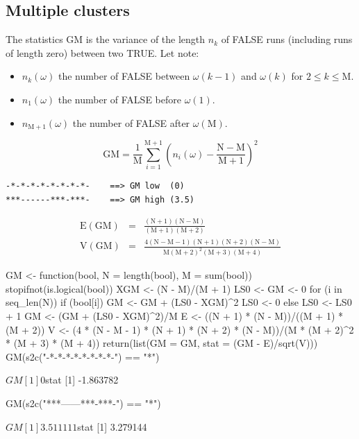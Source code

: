 \documentclass{article}
\begin{document}
\subsection{Multiple clusters}

The statistics $\mathrm{GM}$ is the variance of the length $n_k$ of FALSE runs (including
runs of length zero) between two TRUE. Let note:

\begin{itemize}
\item $n_k(\omega)$ the number of FALSE between $\omega(k-1)$ and $\omega(k)$ for $2 \le k \le \mathrm{M}$.
\item $n_1(\omega)$ the number of FALSE before $\omega(1)$.
\item $n_{\mathrm{M+1}}(\omega)$ the number of FALSE after $\omega(\mathrm{M})$.
\end{itemize}

$$
\mathrm{GM} = \frac{1}{\mathrm{M}}\sum_{i = 1}^{\mathrm{M+1}}{\left( n_i(\omega) - \mathrm{\frac{N-M}{M+1}} \right)^2}
$$

\begin{verbatim}
-*-*-*-*-*-*-*-*-    ==> GM low  (0)
***------***-***-    ==> GM high (3.5)
\end{verbatim}

\begin{eqnarray*}
\mathrm{E(GM)} & = & \mathrm{\frac{(N + 1)(N - M)}{(M +1)(M + 2)}} \\
\mathrm{V(GM)} & = & \mathrm{\frac{4(N - M - 1)(N + 1)(N + 2)(N - M)}{M(M + 2)^2(M + 3)(M + 4)}}
\end{eqnarray*}

\begin{Schunk}
\begin{Sinput}
 GM <- function(bool, N = length(bool), M = sum(bool)) {
     stopifnot(is.logical(bool))
     XGM <- (N - M)/(M + 1)
     LS0 <- GM <- 0
     for (i in seq_len(N)) {
         if (bool[i]) {
             GM <- GM + (LS0 - XGM)^2
             LS0 <- 0
         }
         else {
             LS0 <- LS0 + 1
         }
     }
     GM <- (GM + (LS0 - XGM)^2)/M
     E <- ((N + 1) * (N - M))/((M + 1) * (M + 2))
     V <- (4 * (N - M - 1) * (N + 1) * (N + 2) * (N - M))/(M * 
         (M + 2)^2 * (M + 3) * (M + 4))
     return(list(GM = GM, stat = (GM - E)/sqrt(V)))
 }
 GM(s2c("-*-*-*-*-*-*-*-*-") == "*")
\end{Sinput}
\begin{Soutput}
$GM
[1] 0

$stat
[1] -1.863782
\end{Soutput}
\begin{Sinput}
 GM(s2c("***------***-***-") == "*")
\end{Sinput}
\begin{Soutput}
$GM
[1] 3.511111

$stat
[1] 3.279144
\end{Soutput}
\end{Schunk}
\end{document}

